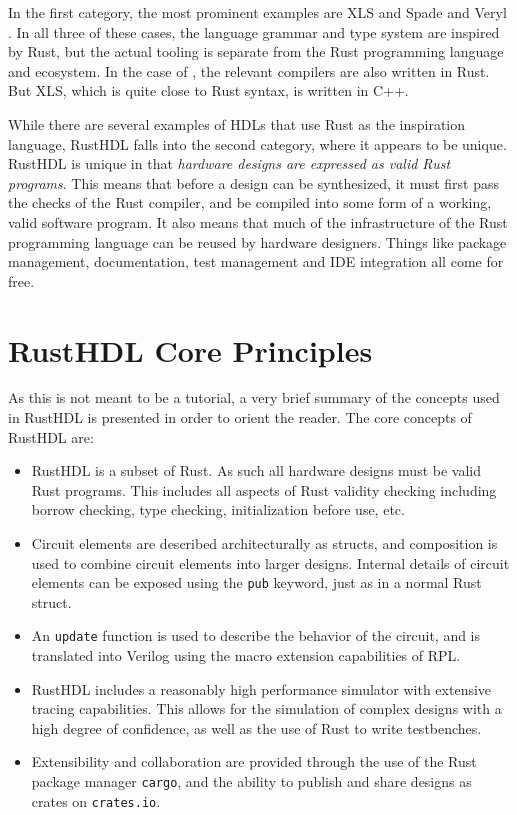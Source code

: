 \documentclass[conference]{IEEEtran}
\begin{document}
In the first category, the most prominent examples are XLS \cite{b4} and Spade \cite{b1} and Veryl \cite{b5}.  
In all three of these cases, the language grammar and type system are inspired by Rust, but 
the actual tooling is separate from the Rust programming language and ecosystem.  In the case of 
\cite{b1, b5}, the relevant compilers are also written in Rust.  But XLS, which is quite close to 
Rust syntax, is written in C++.

While there are several examples of HDLs that use Rust as the inspiration language, RustHDL falls 
into the second category, where it appears to be unique.  
RustHDL is unique in that \emph{hardware designs are expressed as valid Rust programs}.
This means that before a design can be synthesized, it must first pass the checks of the Rust
compiler, and be compiled into some form of a working, valid software program.
It also means that much of the infrastructure of the Rust programming language can be reused
by hardware designers.  Things like package management, documentation, test management and IDE 
integration all come for free.

\section{RustHDL Core Principles}\label{sec:core}

As this is not meant to be a tutorial, a very brief summary of the concepts used in RustHDL is presented
in order to orient the reader.  The core concepts of RustHDL are:

\begin{itemize}
  \item RustHDL is a subset of Rust.  As such all hardware designs must be valid Rust programs.  This includes
  all aspects of Rust validity checking including borrow checking, type checking, initialization before 
  use, etc.
  \item Circuit elements are described architecturally as structs, and composition is used to combine 
  circuit elements into larger designs. Internal details of circuit elements can be exposed using the 
  \verb|pub| keyword, just as in a normal Rust struct.
  \item An \verb|update| function is used to describe the behavior of the circuit, and is 
  translated into Verilog using the macro extension capabilities of RPL.
  \item RustHDL includes a reasonably high performance simulator with extensive tracing capabilities.
  This allows for the simulation of complex designs with a high degree of confidence, as well as 
  the use of Rust to write testbenches.
  \item Extensibility and collaboration are provided through the use of the Rust package manager \verb|cargo|, and 
  the ability to publish and share designs as crates on \verb|crates.io|.
\end{itemize}
\end{document}
